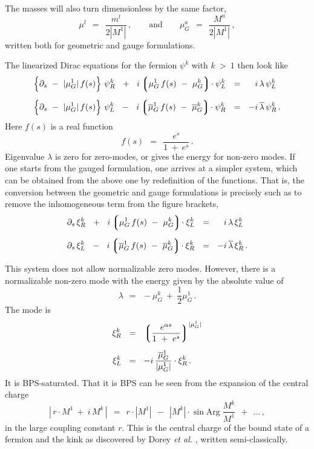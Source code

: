 \documentclass[epsfig,12pt]{article}
\def\beq{\begin{equation}}
\def\eeq{\end{equation}}
\def\beq{\begin{equation}}
\def\eeq{\end{equation}}
\newcommand{\p}{\partial}
\newcommand{\ov}{\overline}
\newcommand{\lgr}{\left\lgroup}
\newcommand{\rgr}{\right\rgroup}
\begin{document}
       The masses will also turn dimensionless by the same factor,
\beq
       \mu^l  ~~=~~ \frac{ m^l }
                        {2 |M^1|}\,,
	\qquad
	\text{and}
	\qquad
	\mu_G^a ~~=~~ \frac{ M^a }
                          {2 |M^1|}\,,
\eeq
       written both for geometric and gauge formulations.

       The linearized Dirac equations for the fermion $ \psi^k $ with $ k ~>~ 1 $ then look like
\begin{align}
%
\notag
       \Big\{ \p_s  ~-~ |\mu_G^1|\, f(s) \Big\}\,\, \psi_R^k   ~~+~~  i \lgr  \mu_G^1\, f(s)  ~-~  \mu_G^k \rgr\! \cdot \psi_L^k  
       & ~~=~~ \phantom{-} i\, \lambda\, \psi_L^k   \\[2mm]
%
       \Big\{ \p_s  ~-~ |\mu_G^1|\, f(s) \Big\}\,\, \psi_L^k   ~~-~~  i \lgr \ov{\mu}{}_G^1\, f(s)  ~-~ \ov{\mu}{}_G^k \rgr\! \cdot \psi_R^k 
       & ~~=~~ - i\, \ov{\lambda}\, \psi_R^k \,.
\end{align}
       Here $ f(s) $ is a real function
\beq
       f(s) ~~=~~ \frac{     e^s     }
                       { 1  ~+~  e^s }\,.
\eeq
       Eigenvalue $ \lambda $ is zero for zero-modes, or gives the energy for non-zero modes.
       If one starts from the gauged formulation, one arrives at a simpler system, which can be obtained from the
       above one by redefinition of the functions.
       That is, the conversion between the geometric and gauge formulations is precisely such as to remove the inhomogeneous term from the
       figure brackets,
\begin{align}
%
\notag
       \p_s\, \xi_R^k  ~~+~~  i \lgr \mu_G^1\, f(s) ~-~ \mu_G^k \rgr\! \cdot \xi_L^k  & ~~=~~ \phantom{-} i\, \lambda\, \xi_L^k \\[2mm]
%
       \p_s\, \xi_L^k  ~~-~~  i \lgr \ov{\mu}{}_G^1\, f(s) ~-~ \ov{\mu}{}_G^k \rgr\! \cdot \xi_R^k & ~~=~~ - i\, \ov{\lambda}\, \xi_R^k \,.
\end{align}
       
       This system does not allow normalizable zero modes.
       However, there is a normalizable non-zero mode with the energy given by the absolute value of 
\beq
       \lambda  ~~=~~  - \mu_G^k  ~+~ \frac{1}{2} \mu_G^1\,.
\eeq
       The mode is
\begin{align}
%
\notag
       \xi_R^k  & ~~=~~  \lgr \frac{  e^{\alpha s}  }
                                   {   1 ~+~ e^s    }  \rgr^{ |\mu_G^1| }  \\[2mm]
%
       \xi_L^k  & ~~=~~  - i\, \frac{ \ov{\mu}{}_G^1 }
                                    {  | \mu_G^1 |   } \cdot \xi_R^k\,.
\end{align}
       It is  BPS-saturated. 
       That it is BPS can be seen from the expansion of the central charge
\beq
       |\, r \cdot M^1  ~+~ i\, M^k \,|  ~~=~~ r \cdot | M^1 |  ~~-~~ | M^k | \cdot \sin \text{Arg}\; \frac { M^k } 
                                                                                                            { M^1 }  
                                                                ~~+~~ ... \,,
\eeq
       in the large coupling constant $ r $.
       This is the central charge of the bound state of a fermion and the kink 
       as discovered by Dorey {\it et al.} \cite{Dorey:1999zk}, written semi-classically.
\end{document}
